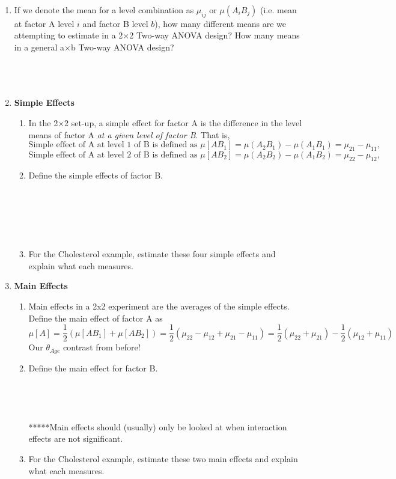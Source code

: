 \begin{enumerate}
\item If we denote the mean for a level combination as $\mu_{ij}$ or $\mu(A_iB_j)$ (i.e. mean at factor A level $i$ and factor B level $b$), how many different means are we attempting to estimate in a 2$\times$2 Two-way ANOVA design?  How many means in a general a$\times$b Two-way ANOVA design?\\~\\~\\~\\
\item \textbf{Simple Effects}\\
\begin{enumerate}
\item In the 2$\times$2 set-up, a simple effect for factor A is the difference in the level means of factor A \textit{at a given level of factor B}.  That is,
$$\text{Simple effect of A at level }1\text{ of B is defined as }\mu[AB_1]=\mu(A_2B_1)-\mu(A_1B_1)=\mu_{21}-\mu_{11},$$ 
$$\text{Simple effect of A at level }2\text{ of B is defined as }\mu[AB_2]=\mu(A_2B_2)-\mu(A_1B_2)=\mu_{22}-\mu_{12},$$ 
\item Define the simple effects of factor B.\\~\\~\\~\\~\\~\\
\item For the Cholesterol example, estimate these four simple effects and explain what each measures.
\end{enumerate}
\newpage

\item \textbf{Main Effects}
\begin{enumerate}
\item Main effects in a 2x2 experiment are the averages of the simple effects.  Define the main effect of factor A as
$$\mu[A]=\frac{1}{2}(\mu[AB_1]+\mu[AB_2])=\frac{1}{2}(\mu_{22}-\mu_{12}+\mu_{21}-\mu_{11})=\frac{1}{2}(\mu_{22}+\mu_{21})-\frac{1}{2}(\mu_{12}+\mu_{11})$$
Our $\theta_{Age}$ contrast from before!
\item Define the main effect for factor B.\\~\\~\\~\\~\\
*****Main effects should (usually) only be looked at when interaction effects are not significant.\\
\item For the Cholesterol example, estimate these two main effects and explain what each measures.\\~\\~\\~\\~\\
\end{enumerate}


\end{enumerate}
